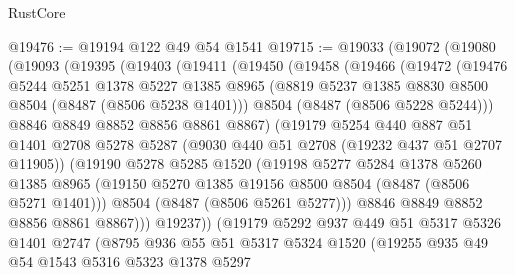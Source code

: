 \begin{lexlean}{RustCore}
\begin{coremodule}
@19476 := @19194 @122 @49 @54 @1541
@19715 := @19033
    (@19072
      (@19080
        (@19093
          (@19395
            (@19403
              (@19411
                (@19450
                  (@19458
                    (@19466
                      (@19472
                        (@19476
                          @5244
                          @5251
                          @1378
                          @5227
                          @1385
                          @8965
                          (@8819 @5237 @1385 @8830 @8500 @8504 (@8487 (@8506 @5238 @1401)))
                          @8504
                          (@8487 (@8506 @5228 @5244)))
                        @8846
                        @8849
                        @8852
                        @8856
                        @8861
                        @8867)
                      (@19179
                        @5254
                        @440
                        @887
                        @51
                        @1401
                        @2708
                        @5278
                        @5287
                        (@9030 @440 @51 @2708 (@19232 @437 @51 @2707 @11905))
                        (@19190
                          @5278
                          @5285
                          @1520
                          (@19198
                            @5277
                            @5284
                            @1378
                            @5260
                            @1385
                            @8965
                            (@19150 @5270 @1385 @19156 @8500 @8504 (@8487 (@8506 @5271 @1401)))
                            @8504
                            (@8487 (@8506 @5261 @5277)))
                          @8846
                          @8849
                          @8852
                          @8856
                          @8861
                          @8867)))
                    @19237))
                (@19179
                  @5292
                  @937
                  @449
                  @51
                  @5317
                  @5326
                  @1401
                  @2747
                  (@8795
                    @936
                    @55
                    @51
                    @5317
                    @5324
                    @1520
                    (@19255
                      @935
                      @49
                      @54
                      @1543
                      @5316
                      @5323
                      @1378
                      @5297

\end{coremodule}
\end{lexlean}
